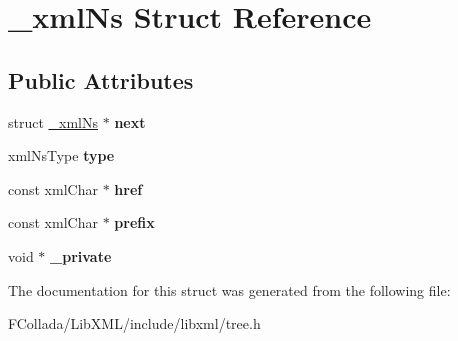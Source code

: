 \hypertarget{struct__xmlNs}{
\section{\_\-xmlNs Struct Reference}
\label{struct__xmlNs}
}
\subsection*{Public Attributes}
\begin{DoxyCompactItemize}
\item 
\hypertarget{struct__xmlNs_ab79fd0a42e28dd61e73c131c58369a69}{
struct \hyperlink{struct__xmlNs}{\_\-xmlNs} $\ast$ {\bfseries next}}
\label{struct__xmlNs_ab79fd0a42e28dd61e73c131c58369a69}

\item 
\hypertarget{struct__xmlNs_a84c713211df0640c7cfb1e7c64149214}{
xmlNsType {\bfseries type}}
\label{struct__xmlNs_a84c713211df0640c7cfb1e7c64149214}

\item 
\hypertarget{struct__xmlNs_a293a79d98f3e8dc28f9997fd9cf3bd04}{
const xmlChar $\ast$ {\bfseries href}}
\label{struct__xmlNs_a293a79d98f3e8dc28f9997fd9cf3bd04}

\item 
\hypertarget{struct__xmlNs_a91810d0b5939f171f87bc75bbcdf8a2b}{
const xmlChar $\ast$ {\bfseries prefix}}
\label{struct__xmlNs_a91810d0b5939f171f87bc75bbcdf8a2b}

\item 
\hypertarget{struct__xmlNs_a3222313b0824c3269b6ecdcfc428b01d}{
void $\ast$ {\bfseries \_\-private}}
\label{struct__xmlNs_a3222313b0824c3269b6ecdcfc428b01d}

\end{DoxyCompactItemize}


The documentation for this struct was generated from the following file:\begin{DoxyCompactItemize}
\item 
FCollada/LibXML/include/libxml/tree.h\end{DoxyCompactItemize}
